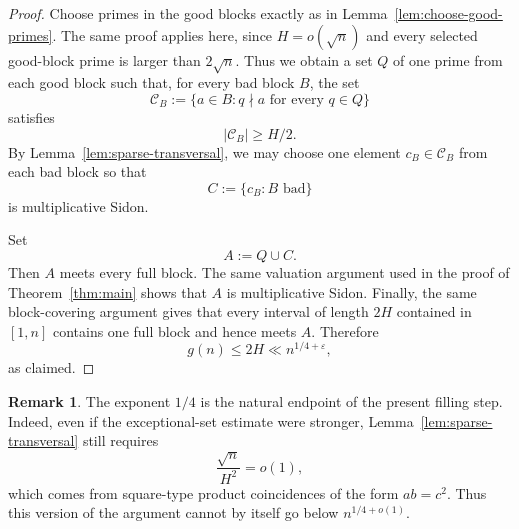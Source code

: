 \documentclass[11pt,reqno]{amsart}
\numberwithin{equation}{section}
\theoremstyle{plain}
\theoremstyle{definition}
\newtheorem{remark}[theorem]{Remark}
\newcommand{\eps}{\varepsilon}
\begin{document}
\begin{proof}
Choose primes in the good blocks exactly as in
Lemma~\ref{lem:choose-good-primes}.  The same proof applies here, since
$H=o(\sqrt n)$ and every selected good-block prime is larger than $2\sqrt n$.
Thus we obtain a set $Q$ of one prime from each good block such that, for every
bad block $B$, the set
\[
        \mathcal C_B:=\{a\in B:q\nmid a\text{ for every }q\in Q\}
\]
satisfies
\[
        |\mathcal C_B|\ge H/2.
\]
By Lemma~\ref{lem:sparse-transversal}, we may choose one element
$c_B\in\mathcal C_B$ from each bad block so that
\[
        C:=\{c_B:B\text{ bad}\}
\]
is multiplicative Sidon.

Set
\[
        A:=Q\cup C.
\]
Then $A$ meets every full block.  The same valuation argument used in the proof
of Theorem~\ref{thm:main} shows that $A$ is multiplicative Sidon.  Finally, the
same block-covering argument gives that every interval of length $2H$ contained
in $[1,n]$ contains one full block and hence meets $A$.  Therefore
\[
        g(n)\le 2H\ll n^{1/4+\eps},
\]
as claimed.
\end{proof}

\begin{remark}
The exponent $1/4$ is the natural endpoint of the present filling step.  Indeed,
even if the exceptional-set estimate were stronger, Lemma~\ref{lem:sparse-transversal}
still requires
\[
        \frac{\sqrt n}{H^2}=o(1),
\]
which comes from square-type product coincidences of the form $ab=c^2$.
Thus this version of the argument cannot by itself go below
$n^{1/4+o(1)}$.
\end{remark}
\end{document}
